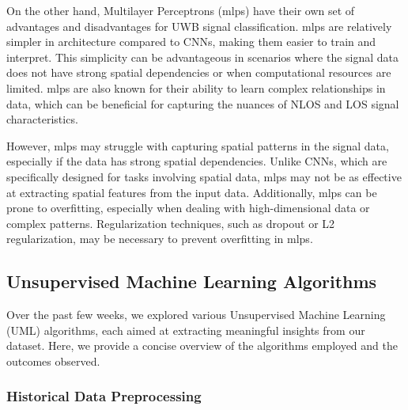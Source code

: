 On the other hand, Multilayer Perceptrons (\acrshort{mlp}s) have their own set of advantages and disadvantages for UWB signal classification. \acrshort{mlp}s are relatively simpler in architecture compared to CNNs, making them easier to train and interpret. This simplicity can be advantageous in scenarios where the signal data does not have strong spatial dependencies or when computational resources are limited. \acrshort{mlp}s are also known for their ability to learn complex relationships in data, which can be beneficial for capturing the nuances of NLOS and LOS signal characteristics.

However, \acrshort{mlp}s may struggle with capturing spatial patterns in the signal data, especially if the data has strong spatial dependencies. Unlike CNNs, which are specifically designed for tasks involving spatial data, \acrshort{mlp}s may not be as effective at extracting spatial features from the input data. Additionally, \acrshort{mlp}s can be prone to overfitting, especially when dealing with high-dimensional data or complex patterns. Regularization techniques, such as dropout or L2 regularization, may be necessary to prevent overfitting in \acrshort{mlp}s.




\subsection{Unsupervised Machine Learning Algorithms}\label{uml}

Over the past few weeks, we explored various Unsupervised Machine Learning (UML) algorithms, each aimed at extracting meaningful insights from our dataset. Here, we provide a concise overview of the algorithms employed and the outcomes observed.

\subsubsection{Historical Data Preprocessing}

